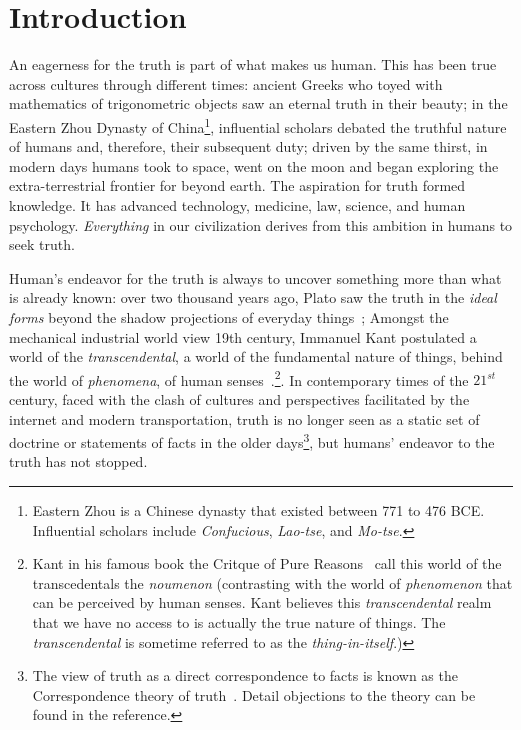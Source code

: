 
\chapter*{Introduction}

An eagerness for the truth is part of what makes us human. This has been true across cultures through different times: ancient Greeks who toyed with mathematics of trigonometric objects saw an eternal truth in their beauty; in the Eastern Zhou Dynasty of China\footnote{Eastern Zhou is a Chinese dynasty that existed between 771 to 476 BCE. Influential scholars include \textit{Confucious}, \textit{Lao-tse}, and \textit{Mo-tse}.}, influential scholars debated the truthful nature of humans and,
therefore, their subsequent duty; driven by the same thirst, in modern days humans took to space, went on the moon and began exploring the extra-terrestrial frontier for beyond earth. The aspiration for truth formed knowledge. It has advanced technology, medicine, law, science, and human psychology. \textit{Everything} in our civilization derives from this ambition in humans to seek truth.


Human's endeavor for the truth is always to uncover something more than what is already known: over two thousand years ago, Plato saw the truth in the \textit{ideal forms} beyond the shadow projections of everyday things~\cite{plato1961republic}; Amongst the mechanical industrial world view 19th century, Immanuel Kant postulated a world of the \textit{transcendental},  a world of the fundamental
nature of things, behind the world of \textit{phenomena}, of human senses~\cite{kant1908critique}.\footnote{Kant in his famous book the Critque of Pure Reasons~\cite{kant1908critique} call this world of the transcedentals the \textit{noumenon} (contrasting with the world
of \textit{phenomenon} that can be perceived by human senses.
Kant believes this \textit{transcendental} realm that we have no access to is actually the true nature of things. The \textit{transcendental} is sometime referred to as the \textit{thing-in-itself}.)}. In contemporary times of the $21^{st}$ century, faced with the clash of cultures and perspectives facilitated by the internet and modern transportation, truth is no longer seen as a static set of doctrine or statements of facts in the older days\footnote{The view of truth as a
direct correspondence to facts is known as the Correspondence theory
of truth~\cite{sep-truth-correspondence}. Detail objections to the theory can be found in the reference.}, but humans' endeavor to the truth has not stopped.

